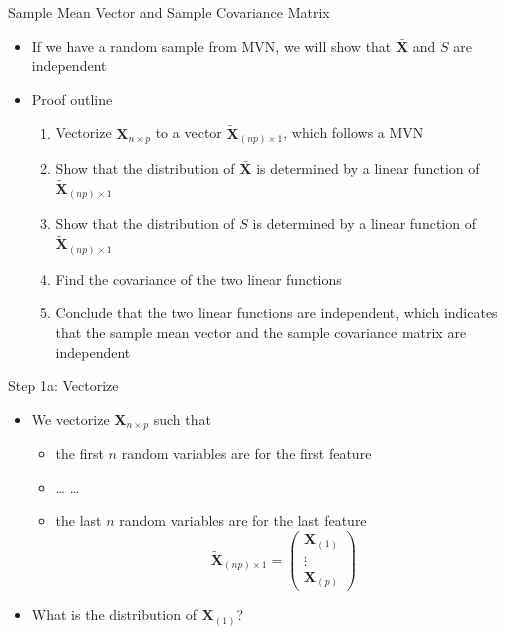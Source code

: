 \documentclass[
  ignorenonframetext,
]{beamer}
\providecommand{\tightlist}{%
  \setlength{\itemsep}{0pt}\setlength{\parskip}{0pt}}
\begin{document}
\begin{frame}{Sample Mean Vector and Sample Covariance Matrix}
\protect\hypertarget{sample-mean-vector-and-sample-covariance-matrix}{}
\begin{itemize}
\tightlist
\item
  If we have a random sample from MVN, we will show that
  \(\bar{\mathbf X}\) and \(S\) are independent
\item
  Proof outline

  \begin{enumerate}
  \tightlist
  \item
    Vectorize \(\mathbf X_{n\times p}\) to a vector
    \(\tilde {\mathbf X}_{(np)\times 1}\), which follows a MVN
  \item
    Show that the distribution of \(\bar{\mathbf X}\) is determined by a
    linear function of \(\tilde {\mathbf X}_{(np)\times 1}\)
  \item
    Show that the distribution of \(S\) is determined by a linear
    function of \(\tilde {\mathbf X}_{(np)\times 1}\)
  \item
    Find the covariance of the two linear functions
  \item
    Conclude that the two linear functions are independent, which
    indicates that the sample mean vector and the sample covariance
    matrix are independent
  \end{enumerate}
\end{itemize}
\end{frame}

\begin{frame}{Step 1a: Vectorize}
\protect\hypertarget{step-1a-vectorize}{}
\begin{itemize}
\tightlist
\item
  We vectorize \(\mathbf X_{n\times p}\) such that

  \begin{itemize}
  \tightlist
  \item
    the first \(n\) random variables are for the first feature
  \item
    \ldots{} \ldots{}
  \item
    the last \(n\) random variables are for the last feature
    \[\tilde {\mathbf X}_{(np)\times 1}=
    \begin{pmatrix}
    \mathbf X_{(1)}\\ \vdots \\ \mathbf X_{(p)} \end{pmatrix}\]
  \end{itemize}
\item
  What is the distribution of \(\mathbf X_{(1)}\)?
\end{itemize}
\end{frame}
\end{document}
